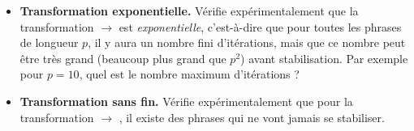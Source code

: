 \documentclass[11pt,class=report,crop=false]{standalone}
\begin{document}
\begin{activite}
\begin{enumerate}
\begin{itemize}
	\item \textbf{Transformation exponentielle.}
	Vérifie expérimentalement que la transformation \rzero\run{} $\rightarrow$ \run\run\rzero{} est \emph{exponentielle}, c'est-à-dire que pour toutes les phrases de longueur $p$, il y aura un nombre fini d'itérations, mais que ce nombre peut être très grand (beaucoup plus grand que $p^2$) avant stabilisation. Par exemple pour $p=10$, quel est le nombre maximum d'itérations ?	

	\item \textbf{Transformation sans fin.}
	Vérifie expérimentalement que pour la transformation  \rzero\run{} $\rightarrow$ \run\run\rzero\rzero{}, il existe des phrases qui ne vont jamais se stabiliser.
	\end{itemize}

\end{enumerate}   
     
\end{activite}
\end{document}
